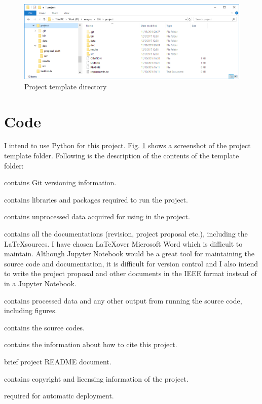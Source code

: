 \documentclass[conference]{IEEEtran}
\begin{document}
\begin{figure}[tbp]
\centerline{\includegraphics[width=130mm]{../../results/Capture.PNG}}
\caption{Project template directory}
\label{fig1}
\end{figure}

\section{Code}
I intend to use Python for this project. Fig. \ref{fig1} shows a screenshot of the project template folder. Following is the description of the contents of the template folder:

\begin{description}[style=multiline,leftmargin=6em]
	\item[\textbf{.git}]{contains Git versioning information.}
	\item[\textbf{bin}] contains libraries and packages required to run the project.
	\item[\textbf{data}] contains unprocessed data acquired for using in the project.
	\item[\textbf{doc}] contains all the documentations (revision, project proposal etc.), including the \LaTeX sources. I have chosen \LaTeX over Microsoft Word which is difficult to maintain. Although Jupyter Notebook would be a great tool for maintaining the source code and documentation, it is difficult for version control and I also intend to write the project proposal and other documents in the IEEE format instead of in a Jupyter Notebook.
	\item[\textbf{results}] contains processed data and any other output from running the source code, including figures.
	\item[\textbf{src}] contains the source codes.
	\item[\textbf{CITATION}] contains the information about how to cite this project.
	\item[\textbf{README}] brief project README document.
	\item[\textbf{LICENSE}] contains copyright and licensing information of the project.
	\item[\textbf{req...s.txt}] required for automatic deployment.
\end{description}
\end{document}
